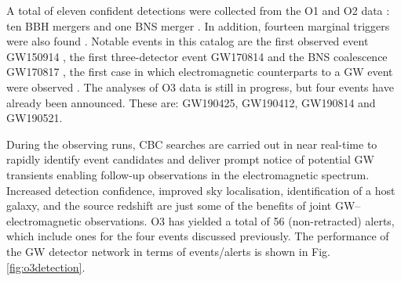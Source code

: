 \documentclass[binding=0.6cm, LaM]{sapthesis}
\begin{document}
	A total of eleven confident detections were collected from the O1 and O2 data \cite{13}:
	ten BBH mergers \cite{14, 52, 58, 59, 60} and one BNS merger \cite{61}.
	In addition, fourteen marginal triggers were also found \cite{13}.
	Notable events in this catalog are the first observed event GW150914 \cite{52},
	the first three-detector event GW170814 \cite{60} and the BNS
	coalescence GW170817 \cite{62}, the first case in which electromagnetic counterparts to a GW event 
	were observed \cite{15}.
        The analyses of O3 data is still in progress, but four events have already been announced.
	These are: GW190425, GW190412, GW190814 and GW190521.

	During the observing runs, CBC searches are carried out in near real-time 
	to rapidly identify event candidates and deliver prompt notice of potential GW transients 
	enabling follow-up observations in the electromagnetic spectrum. 
	Increased detection confidence, improved sky localisation, identification of a host galaxy, 
	and the source redshift are just some of the benefits of joint GW–electromagnetic observations.
	O3 has yielded a total of 56 (non-retracted) alerts, which include ones for the four events discussed previously.
	The performance of the GW detector network in terms of events/alerts is shown in Fig.\,\ref{fig:o3detection}. 
\end{document}
